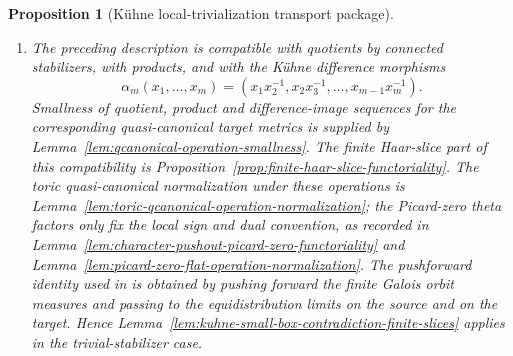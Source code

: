 \documentclass[10pt,a4paper]{amsart}
\theoremstyle{plain}
\newtheorem{proposition}[theorem]{Proposition}
\theoremstyle{plain}
\numberwithin{equation}{section}
\begin{document}
\begin{proposition}[K\"uhne local-trivialization transport package]
\begin{enumerate}[label=\textup{(\alph*)},leftmargin=2em]
		\item The preceding description is compatible with quotients by connected
		stabilizers, with products, and with the K\"uhne difference morphisms
		\[
		\alpha_m(x_1,\ldots,x_m)
		=(x_1x_2^{-1},x_2x_3^{-1},\ldots,x_{m-1}x_m^{-1}).
		\]
		Smallness of quotient, product and difference-image sequences for the
		corresponding quasi-canonical target metrics is supplied by
		Lemma~\ref{lem:qcanonical-operation-smallness}.
		The finite Haar-slice part of this compatibility is
		Proposition~\ref{prop:finite-haar-slice-functoriality}.  The toric
		quasi-canonical normalization under these operations is
		Lemma~\ref{lem:toric-qcanonical-operation-normalization}; the Picard-zero
		theta factors only fix the local sign and dual convention, as recorded in
		Lemma~\ref{lem:character-pushout-picard-zero-functoriality} and
		Lemma~\ref{lem:picard-zero-flat-operation-normalization}.  The pushforward
		identity used in \cite[equation~(6.2)]{Ku1} is obtained by pushing
		forward the finite Galois orbit measures and passing to the equidistribution
		limits on the source and on the target.  Hence
		Lemma~\ref{lem:kuhne-small-box-contradiction-finite-slices} applies in the
		trivial-stabilizer case.
	\end{enumerate}
\end{proposition}
\end{document}
